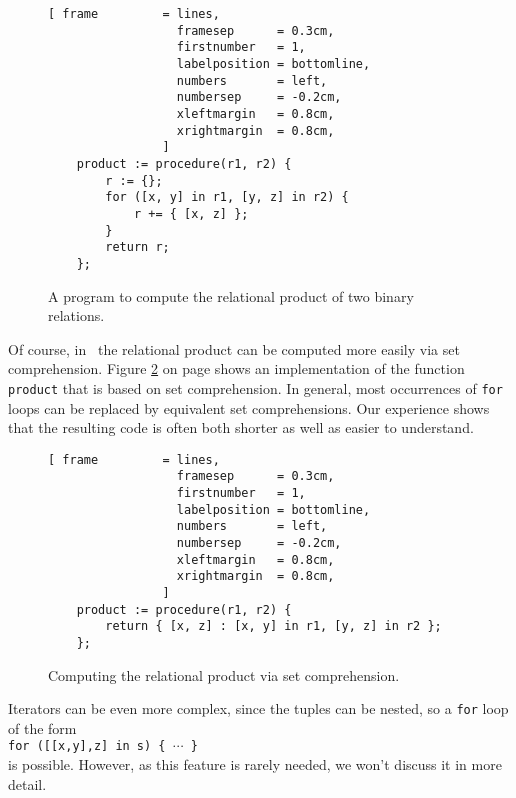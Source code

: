\begin{figure}[!ht]
\centering
\begin{Verbatim}[ frame         = lines, 
                  framesep      = 0.3cm, 
                  firstnumber   = 1,
                  labelposition = bottomline,
                  numbers       = left,
                  numbersep     = -0.2cm,
                  xleftmargin   = 0.8cm,
                  xrightmargin  = 0.8cm,
                ]
    product := procedure(r1, r2) {
        r := {};
        for ([x, y] in r1, [y, z] in r2) {
            r += { [x, z] };
        }
        return r;
    };
\end{Verbatim}
\vspace*{-0.3cm}
\caption{A program to compute the relational product of two binary relations.}
\label{fig:relational-product-for-1.stlx}
\end{figure}

Of course, in \setlx\ the relational product can be computed more easily via set comprehension.
Figure \ref{fig:relational-product.stlx} on page \pageref{fig:relational-product.stlx} shows
an implementation of the function \texttt{product} that is based on set comprehension.  
In general, most occurrences of \texttt{for} loops can be replaced by equivalent set
comprehensions. Our experience shows that the resulting code is often both shorter as well as easier to
understand. 


\begin{figure}[!ht]
\centering
\begin{Verbatim}[ frame         = lines, 
                  framesep      = 0.3cm, 
                  firstnumber   = 1,
                  labelposition = bottomline,
                  numbers       = left,
                  numbersep     = -0.2cm,
                  xleftmargin   = 0.8cm,
                  xrightmargin  = 0.8cm,
                ]
    product := procedure(r1, r2) {
        return { [x, z] : [x, y] in r1, [y, z] in r2 };
    };
\end{Verbatim}
\vspace*{-0.3cm}
\caption{Computing the relational product via set comprehension.}
\label{fig:relational-product.stlx}
\end{figure}

Iterators can be even more complex, since the tuples can be nested, so a \texttt{for} loop of the form
\\[0.2cm]
\hspace*{1.3cm}
\texttt{for ([[x,y],z] in s) \{ $\cdots$ \}}
\\[0.2cm]
is possible.  However, as this feature is rarely needed, we won't discuss it in more detail.


